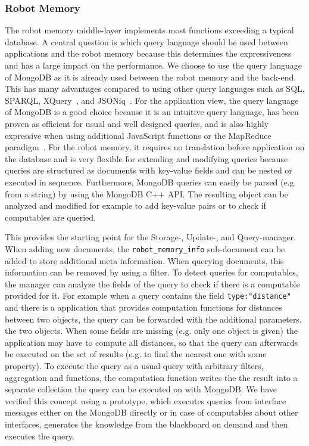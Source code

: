 \documentclass[a4paper,11pt]{article}
\begin{document}
\subsubsection{Robot Memory}
\label{sec:impl-memory}
The robot memory middle-layer implements most functions exceeding a
typical database.
A central question is which query language should be used between
applications and the robot memory because this determines the
expressiveness and has a large impact on the performance. We choose to
use the query language of MongoDB as it is already used between the
robot memory and the back-end. This has many advantages compared to
using other query languages such as SQL, SPARQL,
XQuery~\cite{query-languages}, and JSONiq~\cite{jsoniq}.
%
For the application view, the query language of MongoDB is a good
choice because it is an intuitive query language, has been proven as
efficient for usual and well designed queries, and is also highly
expressive when using additional JavaScript functions or the MapReduce
paradigm~\cite{mongodb,RoboDB}. For the robot memory, it requires no
translation before application on the database and is very flexible
for extending and modifying queries because queries are structured as
documents with key-value fields and can be nested or executed in
sequence. Furthermore, MongoDB queries can easily be parsed (e.g. from
a string) by using the MongoDB C++ API. The resulting object can be
analyzed and modified for example to add key-value pairs or to check
if computables are queried.

This provides the starting point for the Storage-, Update-, and
Query-manager. When adding new documents, the
\texttt{robot\_memory\_info} sub-document can be added to store
additional meta information. When querying documents, this information
can be removed by using a filter. To detect queries for computables,
the manager can analyze the fields of the query to check if there is a
computable provided for it.  For example when a query contains the
field \texttt{type:"distance"} and there is a application that
provides computation functions for distances between two objects, the
query can be forwarded with the additional parameters, the two
objects.  When some fields are missing (e.g. only one object is given)
the application may have to compute all distances, so that the query
can afterwards be executed on the set of results (e.g. to find the
nearest one with some property). To execute the query as a usual query
with arbitrary filters, aggregation and functions, the computation
function writes the the result into a separate collection the query
can be executed on with MongoDB. We have verified this concept using a
prototype, which executes queries from interface messages either on
the MongoDB directly or in case of computables about other interfaces,
generates the knowledge from the blackboard on demand and then
executes the query.
\end{document}
